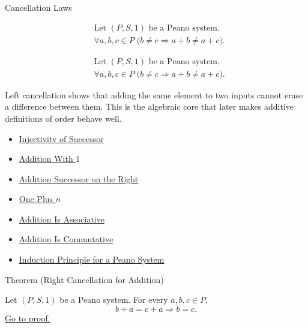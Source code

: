\begin{topicbox}{Cancellation Laws}
\begin{remark*}
\[
\begin{aligned}
&\text{Let } (P,S,1) \text{ be a Peano system.}\\
&\forall a,b,c \in P\;\bigl(b \neq c \Longrightarrow a+b \neq a+c\bigr).
\end{aligned}
\]
\end{remark*}

\begin{remark*}
\[
\begin{aligned}
&\text{Let } (P,S,1) \text{ be a Peano system.}\\
&\forall a,b,c \in P\;\bigl(b \neq c \Longrightarrow a+b \neq a+c\bigr).
\end{aligned}
\]
\end{remark*}

\begin{remark*}[Interpretation]
Left cancellation shows that adding the same element to two inputs cannot
erase a difference between them. This is the algebraic core that later makes
additive definitions of order behave well.
\end{remark*}

\begin{dependencies}
\begin{itemize}
  \item \hyperref[ax:peano-successor-injective]{Injectivity of Successor}
  \item \hyperref[thm:addition-with-one]{Addition With $1$}
  \item \hyperref[thm:addition-successor-on-right]{Addition Successor on the Right}
  \item \hyperref[thm:one-plus-n]{One Plus $n$}
  \item \hyperref[thm:addition-associative]{Addition Is Associative}
  \item \hyperref[thm:addition-commutative]{Addition Is Commutative}
  \item \hyperref[thm:induction-principle-for-peano-system]{Induction Principle for a Peano System}
\end{itemize}
\end{dependencies}

\begin{theorembox}{Theorem (Right Cancellation for Addition)}
\begin{theorem}
\label{thm:addition-right-cancellation}
Let $(P,S,1)$ be a Peano system. For every $a,b,c \in P$,
\[
b+a=c+a
\Longrightarrow
b=c.
\]
\hyperref[prf:addition-right-cancellation]{Go to proof.}
\end{theorem}
\end{theorembox}


\end{topicbox}
